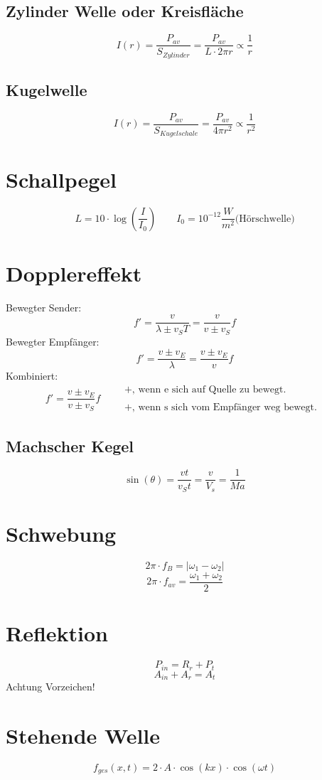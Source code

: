 \subsection{Zylinder Welle oder Kreisfläche}
\[ \boxed{I(r) = \frac{P_{av}}{S_{Zylinder}} = \frac{P_{av}}{L \cdot 2 \pi r} 
\propto \frac{1}{r}} \]
\subsection{Kugelwelle}
\[ \boxed{I(r) = \frac{P_{av}}{S_{Kugelschale}} = \frac{P_{av}}{4 \pi r^2} 
\propto \frac{1}{r^2}} \]

\section{Schallpegel}
\[ \boxed{L = 10 \cdot \log\left(\frac{I}{I_0}\right)} 
\qquad I_0 = 10^{-12} \frac{W}{m^2} \text{(Hörschwelle)} \]

\section{Dopplereffekt}
Bewegter Sender: 
\[ \boxed{f' = \frac{v}{\lambda \pm v_S T} = \frac{v}{v \pm v_S}f} \]
Bewegter Empfänger: 
\[ \boxed{f' = \frac{v \pm v_E}{\lambda} = \frac{v \pm v_E}{v}f} \]
Kombiniert: 
\[ \boxed{f' = \frac{v \pm v_E}{v \pm v_S}f} \qquad \substack{\text{
$+$, wenn e sich auf Quelle zu bewegt. }\\\\\text{
$+$, wenn s sich vom Empfänger weg bewegt. }} \]

\subsection{Machscher Kegel}
\[ \boxed{\sin(\theta) = \frac{v t}{v_S t} = \frac{v}{V_s} = \frac{1}{Ma}} \]

\section{Schwebung}
\[ \boxed{2 \pi \cdot f_B = |\omega_1 - \omega_2|} \]
\[ \boxed{2 \pi \cdot f_{av} = \frac{\omega_1 + \omega_2}{2}} \]

\section{Reflektion}
\[ \boxed{P_{in} = R_r + P_t} \]
\[ \boxed{A_{in} + A_r = A_t} \]
Achtung Vorzeichen!

\section{Stehende Welle}
\[ \boxed{f_{ges}(x,t) = 2 \cdot A \cdot \cos(k x) \cdot \cos(\omega t)} \]
